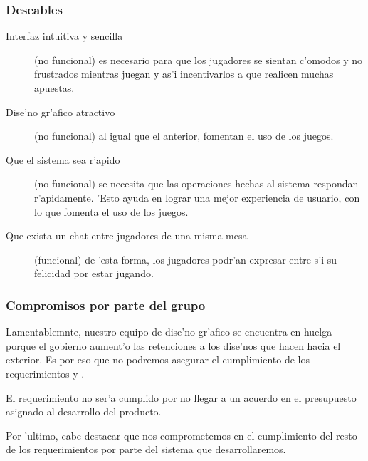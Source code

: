 \subsubsection{Deseables}
\begin{description}
\item[Interfaz intuitiva y sencilla] (no funcional) es necesario para que los jugadores se sientan c'omodos y no frustrados mientras juegan y as'i incentivarlos a que realicen muchas apuestas.
\item[Dise'no gr'afico atractivo] (no funcional) al igual que el anterior, fomentan el uso de los juegos.
\item[Que el sistema sea r'apido] (no funcional) se necesita que las operaciones hechas al sistema respondan r'apidamente. 'Esto ayuda en lograr una mejor experiencia de usuario, con lo que fomenta el uso de los juegos.
\item[Que exista un chat entre jugadores de una misma mesa] (funcional) de 'esta forma, los jugadores podr'an expresar entre s'i su felicidad por estar jugando.
\end{description}


\subsubsection{Compromisos por parte del grupo}
Lamentablemnte, nuestro equipo de dise'no gr'afico se encuentra en huelga porque el gobierno aument'o las retenciones a los dise'nos que hacen hacia el exterior. Es por eso que no podremos asegurar el cumplimiento de los requerimientos  y . 

El requerimiento  no ser'a cumplido por no llegar a un acuerdo en el presupuesto asignado al desarrollo del producto.

Por 'ultimo, cabe destacar que nos comprometemos en el cumplimiento del resto de los requerimientos por parte del sistema que desarrollaremos.
